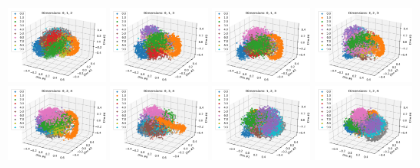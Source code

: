 \documentclass[a4paper, 11pt, twocolumn, final]{article} %
\begin{document}
\begin{figure}
  \includegraphics[width=0.23\textwidth]{pca/012.png}
  \includegraphics[width=0.23\textwidth]{pca/013.png}
  \includegraphics[width=0.23\textwidth]{pca/014.png}
  \includegraphics[width=0.23\textwidth]{pca/023.png}
  \includegraphics[width=0.23\textwidth]{pca/024.png}
  \includegraphics[width=0.23\textwidth]{pca/034.png}
  \includegraphics[width=0.23\textwidth]{pca/123.png}
  \includegraphics[width=0.23\textwidth]{pca/124.png}

\end{figure}
\end{document}
